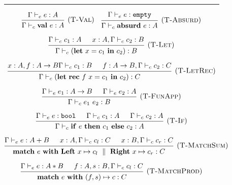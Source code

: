 \documentclass[class=article, crop=false]{standalone}
\begin{document}
\begin{figure}[H]
    \rule[0.4pt]{\textwidth}{0.4pt}



    $$
    \begin{prooftree}
      \hypo{\Gamma \vdash_e e : A}
      \infer1[(\textsc{T-Val})]{\Gamma \vdash_c \effVal e : A}
    \end{prooftree}
    \quad
    \begin{prooftree}
      \hypo{\Gamma \vdash_e e : \emptyType}
      \infer1[(\textsc{T-Absurd})]{\Gamma \vdash_c \effAbsurd e : A}
    \end{prooftree}
    $$
    
    $$
    \begin{prooftree}
      \hypo{\Gamma \vdash_c c_1 : A}
      \hypo{x : A, \Gamma \vdash_c c_2 : B}
      \infer2[(\textsc{T-Let})]{\Gamma \vdash_c (\effLet x = c_1 \effIn c_2) : B}
    \end{prooftree}
    $$
    
    $$
    \begin{prooftree}
      \hypo{x : A, f : A \to B \Gamma \vdash_c c_1 : B}
      \hypo{f : A \to B, \Gamma \vdash_c c_2 : C}
      \infer2[(\textsc{T-LetRec})]{\Gamma \vdash_c (\effLet \effRec f\ x = c_1 \effIn c_2) : C}
    \end{prooftree}
    $$
    
    $$
    \begin{prooftree}
      \hypo{\Gamma \vdash_e e_1 : A \to B}
      \hypo{\Gamma \vdash_e e_2 : A}
      \infer2[(\textsc{T-FunApp})]{\Gamma \vdash_c e_1\ e_2 : B}
    \end{prooftree}
    $$
    
    $$
    \begin{prooftree}
      \hypo{\Gamma \vdash_e e : \boolType}
      \hypo{\Gamma \vdash_c c_1 : A}
      \hypo{\Gamma \vdash_c c_2 : A}
      \infer3[(\textsc{T-If})]{\Gamma \vdash_c \effIf e \effThen c_1 \effElse c_2 : A}
    \end{prooftree}
    $$
    
    $$
    \begin{prooftree}
      \hypo{\Gamma \vdash_e e : A + B}
      \hypo{x : A, \Gamma \vdash_c c_l : C}
      \hypo{x : B, \Gamma \vdash_c c_r : C}
      \infer3[(\textsc{T-MatchSum})]{\effMatch e\ \effWith \effLeft x \mapsto c_l \dmid \effRight x \mapsto c_r : C}
    \end{prooftree}
    $$
    
    $$
    \begin{prooftree}
      \hypo{\Gamma \vdash_e e : A * B}
      \hypo{f : A, s: B, \Gamma \vdash_c c_l : C}
      \infer2[(\textsc{T-MatchProd})]{\effMatch e\ \effWith (f,s) \mapsto c : C}
    \end{prooftree}
    $$


\end{figure}
\end{document}
